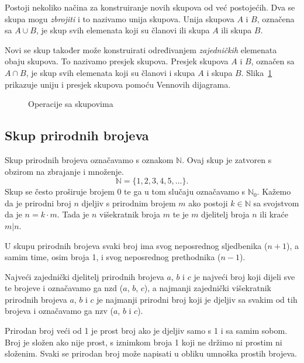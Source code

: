 Postoji nekoliko načina za konstruiranje novih skupova od već postojećih.
Dva se skupa mogu \emph{zbrojiti} i to nazivamo unija skupova.
Unija skupova $A$ i $B$, označena sa $A \cup B$, je skup svih elemenata koji su članovi ili skupa $A$ ili skupa $B$.

Novi se skup također može konstruirati određivanjem \emph{zajedničkih} elemenata obaju skupova.
To nazivamo presjek skupova.
Presjek skupova $A$ i $B$, označen sa $A \cap B$, je skup svih elemenata koji su članovi i skupa $A$ i skupa $B$.
Slika~\ref{fig:operacije-sa-skupovima} prikazuje uniju i presjek skupova pomoću Vennovih dijagrama.

\begin{figure}[h!]
\begin{center}\vspace{0.25cm}
\end{center}
\caption{Operacije sa skupovima}\label{fig:operacije-sa-skupovima}
\end{figure}

\subsection{Skup prirodnih brojeva}\label{subsec:skup-prirodnih-brojeva}
Skup prirodnih brojeva označavamo s oznakom $\mathbb{N}$.
Ovaj skup je zatvoren s obzirom na zbrajanje i množenje.
\[ \mathbb{N}=\{1,2,3,4,5,\ldots\}. \]
Skup se često proširuje brojem 0 te ga u tom slučaju označavamo s $\mathbb{N}_0$.
Kažemo da je prirodni broj $n$ djeljiv s prirodnim brojem $m$ ako postoji $k \in \mathbb{N}$ sa svojstvom da je $n=k \cdot m$.
Tada je $n$ višekratnik broja $m$ te je $m$ djelitelj broja $n$ ili kraće $m|n$.

U skupu prirodnih brojeva svaki broj ima svog neposrednog sljedbenika ($n+1$), a samim time, osim broja 1, i svog neposrednog prethodnika ($n-1$).

Najveći zajednički djelitelj prirodnih brojeva $a$, $b$ i $c$ je najveći broj koji dijeli sve te brojeve i označavamo ga nzd ($a$, $b$, $c$), a najmanji zajednički višekratnik prirodnih brojeva $a$, $b$ i $c$ je najmanji prirodni broj koji je djeljiv sa svakim od tih brojeva i označavamo ga nzv ($a$, $b$ i $c$).

Prirodan broj veći od 1 je prost broj ako je djeljiv samo s 1 i sa samim sobom.
Broj je složen ako nije prost, s iznimkom broja 1 koji ne držimo ni prostim ni složenim.
Svaki se prirodan broj može napisati u obliku umnoška prostih brojeva.